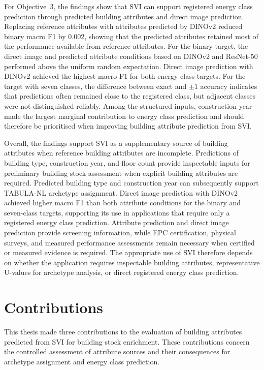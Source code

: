 For Objective~3, the findings show that \ac{SVI} can support registered energy class prediction through predicted building attributes and direct image prediction. Replacing reference attributes with attributes predicted by DINOv2 reduced binary macro F1 by 0.002, showing that the predicted attributes retained most of the performance available from reference attributes. For the binary target, the direct image and predicted attribute conditions based on DINOv2 and ResNet-50 performed above the uniform random expectation. Direct image prediction with DINOv2 achieved the highest macro F1 for both energy class targets. For the target with seven classes, the difference between exact and $\pm1$ accuracy indicates that predictions often remained close to the registered class, but adjacent classes were not distinguished reliably. Among the structured inputs, construction year made the largest marginal contribution to energy class prediction and should therefore be prioritised when improving building attribute prediction from \ac{SVI}.

Overall, the findings support \ac{SVI} as a supplementary source of building attributes when reference building attributes are incomplete. Predictions of building type, construction year, and floor count provide inspectable inputs for preliminary building stock assessment when explicit building attributes are required. Predicted building type and construction year can subsequently support TABULA-NL archetype assignment. Direct image prediction with DINOv2 achieved higher macro F1 than both attribute conditions for the binary and seven-class targets, supporting its use in applications that require only a registered energy class prediction. Attribute prediction and direct image prediction provide screening information, while \ac{EPC} certification, physical surveys, and measured performance assessments remain necessary when certified or measured evidence is required. The appropriate use of \ac{SVI} therefore depends on whether the application requires inspectable building attributes, representative U-values for archetype analysis, or direct registered energy class prediction.

\section{Contributions}
\label{sec:contributions}

This thesis made three contributions to the evaluation of building attributes predicted from \ac{SVI} for building stock enrichment.
These contributions concern the controlled assessment of attribute sources and their consequences for archetype assignment and energy class prediction.

